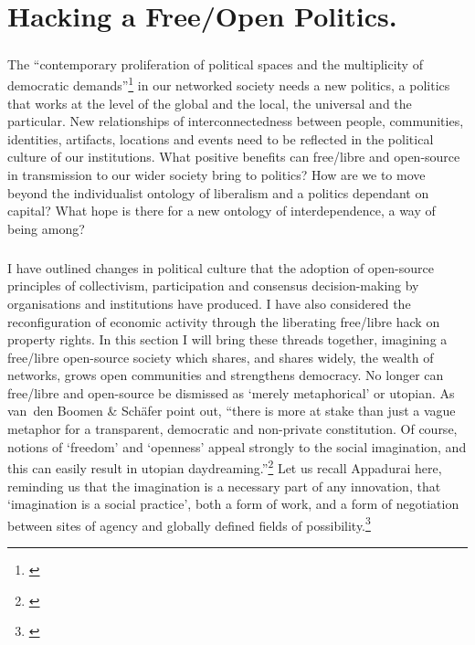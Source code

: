 \newpage
\chapter{Hacking a Free/Open Politics.}
\paragraph{}The ``contemporary proliferation of political spaces and the multiplicity of democratic demands''\footnote{\cite[p.17]{Mouffe:2000fk}} in our networked society needs a new politics, a politics that works at the level of the global and the local, the universal and the particular. New relationships of interconnectedness between people, communities, identities, artifacts, locations and events need to be reflected in the political culture of our institutions. What positive benefits can free/libre and open-source in transmission to our wider society bring to politics? How are we to move beyond the individualist ontology of liberalism and a politics dependant on capital? What hope is there for a new ontology of interdependence, a way of being among?

\paragraph{}I have outlined changes in political culture that the adoption of open-source principles of collectivism, participation and consensus decision-making by organisations and institutions have produced. I have also considered the reconfiguration of economic activity through the liberating free/libre hack on property rights. In this section I will bring these threads together, imagining a free/libre open-source society which shares, and shares widely, the wealth of networks, grows open communities and strengthens democracy. No longer can free/libre and open-source be dismissed as ‘merely metaphorical’ or utopian. As van~den Boomen \& Sch{\"a}fer point out, ``there is more at stake than just a vague metaphor for a transparent, democratic and non-private constitution. Of course, notions of ‘freedom’ and ‘openness’ appeal strongly to the social imagination, and this can easily result in utopian daydreaming.''\footnote{\cite[p. 7]{Boomen:2005uq}} Let us recall Appadurai here, reminding us that the imagination is a necessary part of any innovation, that `imagination is a social practice', both a form of work, and a form of negotiation between sites of agency and globally defined fields of possibility.\footnote{\cite[p. 31]{Appadurai:1996lp}}


